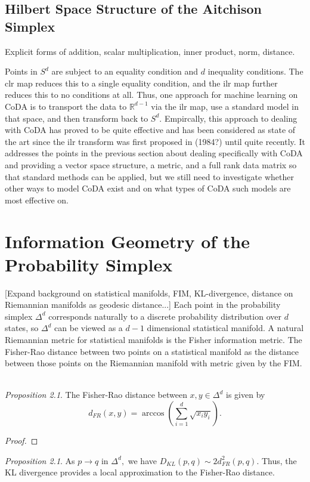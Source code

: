 \documentclass[BSc]{usydthesis}
\numberwithin{equation}{chapter}
\theoremstyle{remark}
\newtheorem{Proposition}[equation]{Proposition}
\begin{document}
\section{Hilbert Space Structure of the Aitchison Simplex}
Explicit forms of addition, scalar multiplication, inner product, norm, distance. 

Points in $S^d$ are subject to an equality condition and $d$ inequality conditions. The clr map reduces this to a single equality condition, and the ilr map further reduces this to no conditions at all. Thus, one approach for machine learning on CoDA is to transport the data to $\mathbb{R}^{d-1}$ via the ilr map, use a standard model in that space, and then transform back to $S^d.$ Empircally, this approach to dealing with CoDA has proved to be quite effective and has been considered as state of the art since the ilr transform was first proposed in (1984?) until quite recently. It addresses the points in the previous section about dealing specifically with CoDA and providing a vector space structure, a metric, and a full rank data matrix so that standard methods can be applied, but we still need to investigate whether other ways to model CoDA exist and on what types of CoDA such models are most effective on. 

\chapter{Information Geometry of the Probability Simplex}
[Expand background on statistical manifolds, FIM, KL-divergence, distance on Riemannian manifolds as geodesic distance...]
Each point in the probability simplex $\Delta^d$ corresponds naturally to a discrete probability distribution over $d$ states, so $\Delta^d$ can be viewed as a $d-1$ dimensional statistical manifold. A natural Riemannian metric for statistical manifolds is the Fisher information metric. The Fisher-Rao distance between two points on a statistical manifold as the distance between those points on the Riemannian manifold with metric given by the FIM. \
\\
\begin{Proposition}
The Fisher-Rao distance between $x,y \in \Delta^d$ is given by $$d_{FR}(x,y) = \arccos \left( \sum_{i=1}^d \sqrt{x_i y_i} \right).$$
\end{Proposition}

\begin{proof}
\end{proof}

\begin{Proposition}
As $p \to q$ in $\Delta^d,$ we have $D_{KL}(p, q) \sim 2 d_{FR}^2 (p,q).$ Thus, the KL divergence provides a local approximation to the Fisher-Rao distance.
\end{Proposition}
\end{document}
